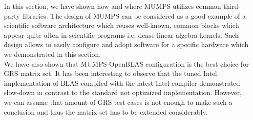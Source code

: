 In this section, we have shown how and where MUMPS utilizes common third-party libraries. The design of MUMPS can be considered as a good example of a scientific software architecture which reuses well-known, common blocks which appear quite often in scientific programs i.e. dense linear algebra kernels. Such design allows to easily configure and adopt software for a specific hardware which we demonstrated in this section.\\


We have also shown that MUMPS-OpenBLAS configuration is the best choice for GRS matrix set. It has been interesting to observe that the tuned Intel implementation of BLAS compiled with the latest Intel compiler demonstrated slow-down in contrast to the standard not optimized implementation. However, we can assume that amount of GRS test cases is not enough to make such a conclusion and thus the matrix set has to be extended considerably.\\